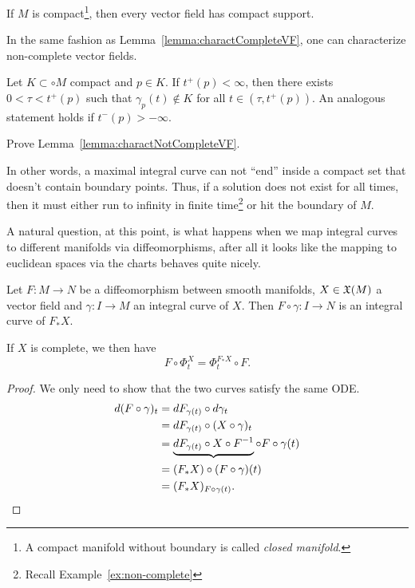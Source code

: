 \begin{corollary}
  If $M$ is compact\footnote{A compact manifold without boundary is called \emph{closed manifold}.}, then every vector field has compact support.
\end{corollary}

In the same fashion as Lemma~\ref{lemma:charactCompleteVF}, one can characterize non-complete vector fields.

\begin{lemma}\label{lemma:charactNotCompleteVF}
  Let $K\subset \circ M$ compact and $p\in K$.
  If $t^+(p) < \infty$, then there exists $0<\tau<t^+(p)$ such that $\gamma_p(t)\not\in K$ for all $t\in (\tau, t^+(p))$.
  An analogous statement holds if $t^-(p) > -\infty$.
\end{lemma}

\begin{exercise}
  Prove Lemma~\ref{lemma:charactNotCompleteVF}.
\end{exercise}

In other words, a maximal integral curve can not ``end'' inside a compact set that doesn't contain boundary points.
Thus, if a solution does not exist for all times, then it must either run to infinity in finite time\footnote{Recall Example~\ref{ex:non-complete}} or hit the boundary of $M$.

A natural question, at this point, is what happens when we map integral curves to different manifolds via diffeomorphisms, after all it looks like the mapping to euclidean spaces via the charts behaves quite nicely.

\begin{proposition}\label{prop:conjpfX}
  Let $F: M \to N$ be a diffeomorphism between smooth manifolds, $X\in\mathfrak{X}(M)$ a vector field and $\gamma:I\to M$ an integral curve of $X$. Then $F\circ\gamma : I \to N$ is an integral curve of $F_* X$.

  If $X$ is complete, we then have
  \begin{equation}
    F\circ\Phi_t^X = \Phi_t^{F_* X}\circ F.
  \end{equation}
\end{proposition}
\begin{proof}
  We only need to show that the two curves satisfy the same ODE.
  \begin{align*}
    d(F\circ \gamma)_t 
    &= dF_{\gamma(t)} \circ d\gamma_t \\
    &= dF_{\gamma(t)} \circ (X \circ \gamma)_t \\
    &= \LaTeXunderbrace{dF_{\gamma(t)} \circ X \circ F^{-1}} \circ F \circ \gamma(t) \\
    &= (F_* X) \circ (F\circ \gamma)(t) \\
    &= (F_* X)_{F\circ\gamma(t)}.
  \end{align*}
\end{proof}

